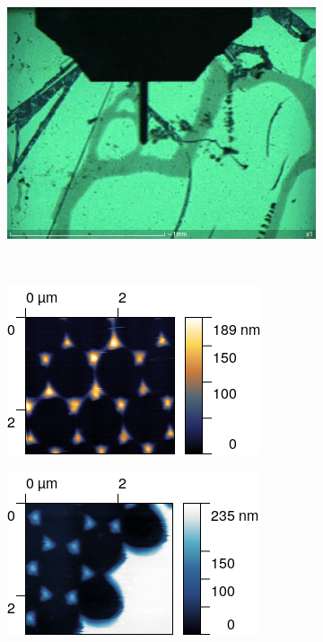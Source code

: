 \documentclass[11pt,a4paper]{article}
\begin{document}
\begin{figure}[H]
\centering
\begin{subfigure}[b]{0.4\textwidth}
\includegraphics[width=\textwidth]{sm_sample2_set.JPG}
\caption{}
\label{fig:sample_3_static}
\end{subfigure}\\
\begin{subfigure}[b]{0.45\textwidth}
\includegraphics[width=\textwidth]{sm_sample2}
\caption{}
\end{subfigure}
\begin{subfigure}[b]{0.45\textwidth}
\includegraphics[width=\textwidth]{sm_sample2_border}

\end{subfigure}
\end{figure}
\end{document}
